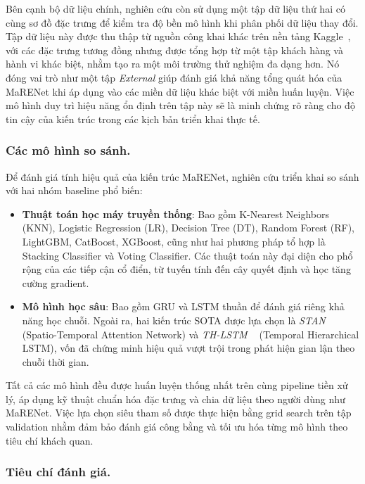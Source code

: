 Bên cạnh bộ dữ liệu chính, nghiên cứu còn sử dụng một tập dữ liệu thứ hai có cùng sơ đồ đặc trưng để kiểm tra độ bền mô hình khi phân phối dữ liệu thay đổi. Tập dữ liệu này được thu thập từ nguồn công khai khác trên nền tảng Kaggle~\cite{ExternalFraudData}, với các đặc trưng tương đồng nhưng được tổng hợp từ một tập khách hàng và hành vi khác biệt, nhằm tạo ra một môi trường thử nghiệm đa dạng hơn. Nó đóng vai trò như một tập \textit{External} giúp đánh giá khả năng tổng quát hóa của MaRENet khi áp dụng vào các miền dữ liệu khác biệt với miền huấn luyện. Việc mô hình duy trì hiệu năng ổn định trên tập này sẽ là minh chứng rõ ràng cho độ tin cậy của kiến trúc trong các kịch bản triển khai thực tế.


\subsubsection{Các mô hình so sánh.}

Để đánh giá tính hiệu quả của kiến trúc MaRENet, nghiên cứu triển khai so sánh với hai nhóm baseline phổ biến:

\begin{itemize}
    \item \textbf{Thuật toán học máy truyền thống}: Bao gồm K-Nearest Neighbors (KNN), Logistic Regression (LR), Decision Tree (DT), Random Forest (RF), LightGBM, CatBoost, XGBoost, cũng như hai phương pháp tổ hợp là Stacking Classifier và Voting Classifier. Các thuật toán này đại diện cho phổ rộng của các tiếp cận cổ điển, từ tuyến tính đến cây quyết định và học tăng cường gradient.
    
    \item \textbf{Mô hình học sâu}: Bao gồm GRU và LSTM thuần để đánh giá riêng khả năng học chuỗi. Ngoài ra, hai kiến trúc SOTA được lựa chọn là \textit{STAN ~\cite{cheng2020spatio}} (Spatio-Temporal Attention Network) và \textit{TH-LSTM ~\cite{Xie2022}} (Temporal Hierarchical LSTM), vốn đã chứng minh hiệu quả vượt trội trong phát hiện gian lận theo chuỗi thời gian.
\end{itemize}

Tất cả các mô hình đều được huấn luyện thống nhất trên cùng pipeline tiền xử lý, áp dụng kỹ thuật chuẩn hóa đặc trưng và chia dữ liệu theo người dùng như MaRENet. Việc lựa chọn siêu tham số được thực hiện bằng grid search trên tập validation nhằm đảm bảo đánh giá công bằng và tối ưu hóa từng mô hình theo tiêu chí khách quan.

\vspace{0.5em}
\subsubsection{Tiêu chí đánh giá.}

